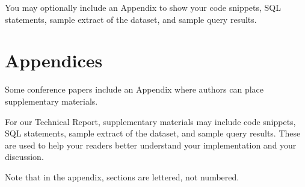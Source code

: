 \documentclass[sigconf, pbalance]{acmart}
\begin{document}
You may optionally include an Appendix to show your code snippets, SQL statements, sample extract of the dataset, and sample query results.








\appendix

\section{Appendices}
Some conference papers include an Appendix where authors can place supplementary materials. 

For our Technical Report, supplementary materials may include code snippets, SQL statements, sample extract of the dataset, and sample query results. These are used to help your readers better understand your implementation and your discussion.

Note that in the appendix, sections are lettered, not
numbered. 
\end{document}
